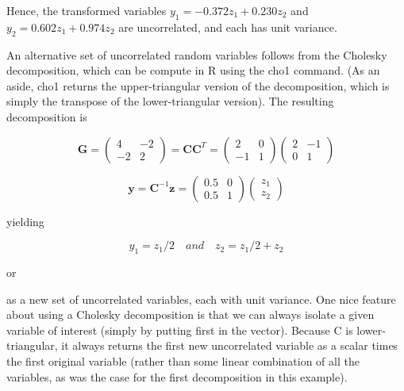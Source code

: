 \documentclass{article}
\begin{document}
Hence, the transformed variables  $ y_1 = -0.372z_1 + 0.230z_2 $ and  $ y_2 = 0.602z_1 + 0.974z_2 $ are uncorrelated, and each has unit variance.

An alternative set of uncorrelated random variables follows from the Cholesky decomposition, which can be compute in R using the cho1 command. (As an aside, cho1 returns the upper-triangular version of the decomposition, which is simply the transpose of the lower-triangular version). The resulting decomposition is

\begin{equation}
\mathbf{G}=\begin{pmatrix}{{{4}}}&{{{-2}}} \\{{{-2}}}&{{{2}}}\end{pmatrix}=\mathbf{C}\mathbf{C}^{T}=\begin{pmatrix}{{{2}}}&{{{0}}} \\{{{-1}}}&{{{1}}}\end{pmatrix}\begin{pmatrix}{{{2}}}&{{{-1}}} \\{{{0}}}&{{{1}}}\end{pmatrix}
\end{equation}

\begin{equation}
\mathbf{y}=\mathbf{C}^{-1}\mathbf{z}=\begin{pmatrix}{{{0.5}}}&{{{0}}} \\{{{0.5}}}&{{{1}}}\end{pmatrix}\begin{pmatrix}{{{z_{1}}}} \\{{{z_{2}}}}\end{pmatrix}
\end{equation}

yielding

\begin{equation}
y_{1}=z_{1}/2\quad and\quad z_{2}=z_{1}/2+z_{2}
\end{equation}

or

as a new set of uncorrelated variables, each with unit variance. One nice feature about using a Cholesky decomposition is that we can always isolate a given variable of interest (simply by putting first in the vector). Because C is lower-triangular, it always returns the first new uncorrelated variable as a scalar times the first original variable (rather than some linear combination of all the variables, as was the case for the first decomposition in this example).
\end{document}
